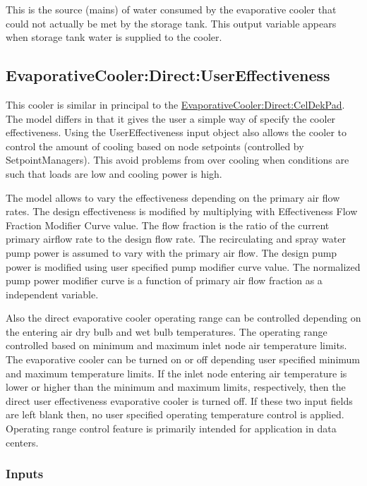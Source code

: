 This is the source (mains) of water consumed by the evaporative cooler that could not actually be met by the storage tank. This output variable appears when storage tank water is supplied to the cooler.

\subsection{EvaporativeCooler:Direct:UserEffectiveness}\label{evaporativecoolerdirectusereffectiveness}

This cooler is similar in principal to the \hyperref[evaporativecoolerdirectceldekpad]{EvaporativeCooler:Direct:CelDekPad}. The model differs in that it gives the user a simple way of specify the cooler effectiveness. Using the UserEffectiveness input object also allows the cooler to control the amount of cooling based on node setpoints (controlled by SetpointManagers). This avoid problems from over cooling when conditions are such that loads are low and cooling power is high.

The model allows to vary the effectiveness depending on the primary air flow rates. The design effectiveness is modified by multiplying with Effectiveness Flow Fraction Modifier Curve value. The flow fraction is the ratio of the current primary airflow rate to the design flow rate. The recirculating and spray water pump power is assumed to vary with the primary air flow. The design pump power is modified using user specified pump modifier curve value. The normalized pump power modifier curve is a function of primary air flow fraction as a independent variable.

Also the direct evaporative cooler operating range can be controlled depending on the entering air dry bulb and wet bulb temperatures. The operating range controlled based on minimum and maximum inlet node air temperature limits. The evaporative cooler can be turned on or off depending user specified minimum and maximum temperature limits. If the inlet node entering air temperature is lower or higher than the minimum and maximum limits, respectively, then the direct user effectiveness evaporative cooler is turned off. If these two input fields are left blank then, no user specified operating temperature control is applied. Operating range control feature is primarily intended for application in data centers.

\subsubsection{Inputs}\label{inputs-1-014}

